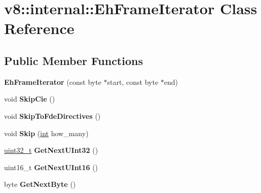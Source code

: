 \hypertarget{classv8_1_1internal_1_1EhFrameIterator}{}\section{v8\+:\+:internal\+:\+:Eh\+Frame\+Iterator Class Reference}
\label{classv8_1_1internal_1_1EhFrameIterator}
\subsection*{Public Member Functions}
\begin{DoxyCompactItemize}
\item 
\mbox{\label{classv8_1_1internal_1_1EhFrameIterator_ab3400429dd074a27ff816b911ac3773b}} 
{\bfseries Eh\+Frame\+Iterator} (const byte $\ast$start, const byte $\ast$end)
\item 
\mbox{\label{classv8_1_1internal_1_1EhFrameIterator_ae8d6c1fe3e900b692cf30adb6492ef5c}} 
void {\bfseries Skip\+Cie} ()
\item 
\mbox{\label{classv8_1_1internal_1_1EhFrameIterator_a12ec0a9a3d6195f11c8d83df4622e5f7}} 
void {\bfseries Skip\+To\+Fde\+Directives} ()
\item 
\mbox{\label{classv8_1_1internal_1_1EhFrameIterator_ae6195a5e9197e681758dfb96ff3a8619}} 
void {\bfseries Skip} (\mbox{\hyperlink{classint}{int}} how\+\_\+many)
\item 
\mbox{\label{classv8_1_1internal_1_1EhFrameIterator_aa209980a8191d5fd5d33fa189e0c8f00}} 
\mbox{\hyperlink{classuint32__t}{uint32\+\_\+t}} {\bfseries Get\+Next\+U\+Int32} ()
\item 
\mbox{\label{classv8_1_1internal_1_1EhFrameIterator_ad3578662fb96a179a77d15ebbc7bb314}} 
uint16\+\_\+t {\bfseries Get\+Next\+U\+Int16} ()
\item 
\mbox{\label{classv8_1_1internal_1_1EhFrameIterator_a77c5a5da7babd2616a2469444b77cdff}} 
byte {\bfseries Get\+Next\+Byte} ()

\end{DoxyCompactItemize}
